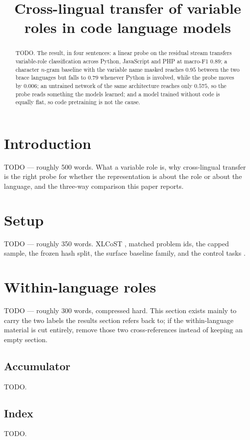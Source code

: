 \documentclass[10pt]{article}
\title{Cross-lingual transfer of variable roles in code language models}
\author{}
\date{}
\begin{document}
\maketitle

\begin{abstract}
TODO. The result, in four sentences: a linear probe on the residual stream
transfers variable-role classification across Python, JavaScript and PHP at
macro-F1 $0.89$; a character $n$-gram baseline with the variable name masked
reaches $0.95$ between the two brace languages but falls to $0.79$ whenever
Python is involved, while the probe moves by $0.006$; an untrained network of
the same architecture reaches only $0.575$, so the probe reads something the
models learned; and a model trained without code is equally flat, so code
pretraining is not the cause.
\end{abstract}

\section{Introduction}
\label{sec:intro}
TODO --- roughly 500 words. What a variable role is, why cross-lingual
transfer is the right probe for whether the representation is about the role
or about the language, and the three-way comparison this paper reports.

\section{Setup}
\label{sec:setup}
TODO --- roughly 350 words. XLCoST \citep{zhu2022xlcost}, matched problem ids,
the capped sample, the frozen hash split, the surface baseline family, and the
control tasks \citep{hewitt2019control}.

\section{Within-language roles}
\label{sec:within}
TODO --- roughly 300 words, compressed hard. This section exists mainly to
carry the two labels the results section refers back to; if the within-language
material is cut entirely, remove those two cross-references instead of keeping
an empty section.

\subsection{Accumulator}
\label{sec:accum}
TODO.

\subsection{Index}
\label{sec:index}
TODO.
\end{document}
